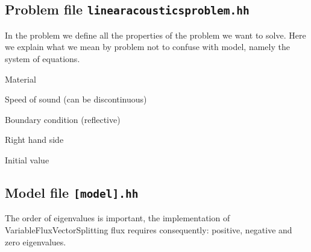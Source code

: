 \documentclass[a4paper,12pt]{article}
\theoremstyle{definition}
\theoremstyle{definition}
\begin{document}
%

\subsection{Problem file \lstinline{linearacousticsproblem.hh}}

In the problem we define all the properties of the problem we want to solve. Here we explain what we mean by problem not to confuse with model, namely the system of equations. %

Material



Speed of sound (can be discontinuous)




Boundary condition (reflective)




Right hand side



Initial value


\subsection{Model file \lstinline{[model].hh} }









The order of eigenvalues is important, the implementation of VariableFluxVectorSplitting flux requires consequently: positive, negative and zero eigenvalues.
\end{document}

